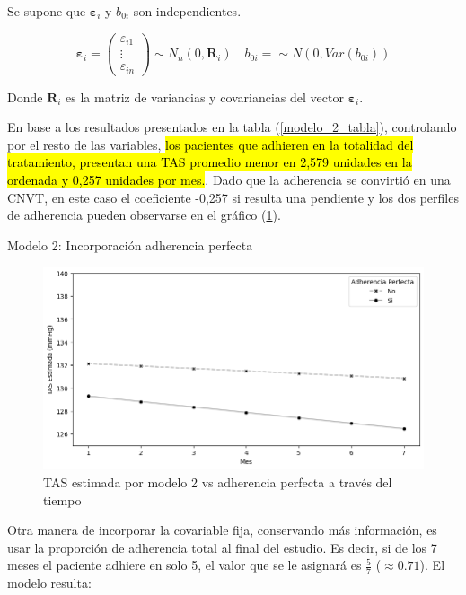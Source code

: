 \documentclass[spanish]{article}
\numberwithin{figure}{subsection}
\numberwithin{equation}{subsection}
\numberwithin{table}{subsection}
\begin{document}
Se supone que $\bm{\varepsilon}_i$ y $b_{0i}$ son independientes.

\[ 
	\bm{\varepsilon}_i = \begin{pmatrix} \varepsilon_{i1} \\ \vdots \\ \varepsilon_{in} \end{pmatrix} \sim N_{n}(0, \bm{R}_i)
	\quad
	b_{0i} = \sim N(0, Var(b_{0i}))
\]

Donde $\bm{R}_i$ es la matriz de variancias y covariancias del vector
$\bm{\varepsilon}_i$.

En base a los resultados presentados en la tabla (\ref{modelo_2_tabla}),
controlando por el resto de las variables, \hl{los pacientes que adhieren en la
totalidad del tratamiento, presentan una TAS promedio menor en 2,579 unidades en
la ordenada y 0,257 unidades por mes.}. Dado que la adherencia se convirtió en
una CNVT, en este caso el coeficiente -0,257 si resulta una pendiente y los dos
perfiles de adherencia pueden observarse en el gráfico (\ref{modelo_2_plot}).

\begin{table}[H]
	\centering
	\caption{Modelo 2: Incorporación adherencia perfecta}
	\label{modelo_2_tabla}
	
\end{table}

\begin{figure}[H]
	\centering
	\includegraphics[scale=0.5]{img/modelo_2.png}
	\caption{TAS estimada por modelo 2 vs adherencia perfecta a través del tiempo}
	\label{modelo_2_plot}
\end{figure}

Otra manera de incorporar la covariable fija, conservando más información, es
usar la proporción de adherencia total al final del estudio. Es decir, si de los
7 meses el paciente adhiere en solo 5, el valor que se le asignará es
$\frac{5}{7}$ ($\approx 0.71$). El modelo resulta:
\end{document}
